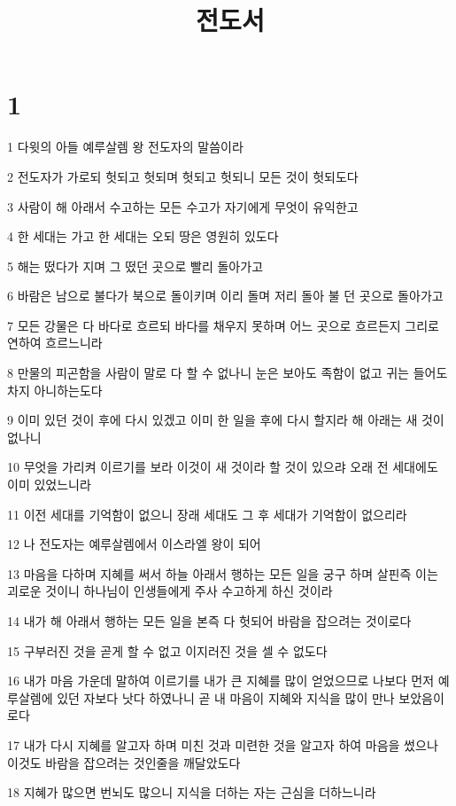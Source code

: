 

\title{전도서}


\chapter{1}

\par 1 다윗의 아들 예루살렘 왕 전도자의 말씀이라
\par 2 전도자가 가로되 헛되고 헛되며 헛되고 헛되니 모든 것이 헛되도다
\par 3 사람이 해 아래서 수고하는 모든 수고가 자기에게 무엇이 유익한고
\par 4 한 세대는 가고 한 세대는 오되 땅은 영원히 있도다
\par 5 해는 떴다가 지며 그 떴던 곳으로 빨리 돌아가고
\par 6 바람은 남으로 불다가 북으로 돌이키며 이리 돌며 저리 돌아 불 던 곳으로 돌아가고
\par 7 모든 강물은 다 바다로 흐르되 바다를 채우지 못하며 어느 곳으로 흐르든지 그리로 연하여 흐르느니라
\par 8 만물의 피곤함을 사람이 말로 다 할 수 없나니 눈은 보아도 족함이 없고 귀는 들어도 차지 아니하는도다
\par 9 이미 있던 것이 후에 다시 있겠고 이미 한 일을 후에 다시 할지라 해 아래는 새 것이 없나니
\par 10 무엇을 가리켜 이르기를 보라 이것이 새 것이라 할 것이 있으랴 오래 전 세대에도 이미 있었느니라
\par 11 이전 세대를 기억함이 없으니 장래 세대도 그 후 세대가 기억함이 없으리라
\par 12 나 전도자는 예루살렘에서 이스라엘 왕이 되어
\par 13 마음을 다하며 지혜를 써서 하늘 아래서 행하는 모든 일을 궁구 하며 살핀즉 이는 괴로운 것이니 하나님이 인생들에게 주사 수고하게 하신 것이라
\par 14 내가 해 아래서 행하는 모든 일을 본즉 다 헛되어 바람을 잡으려는 것이로다
\par 15 구부러진 것을 곧게 할 수 없고 이지러진 것을 셀 수 없도다
\par 16 내가 마음 가운데 말하여 이르기를 내가 큰 지혜를 많이 얻었으므로 나보다 먼저 예루살렘에 있던 자보다 낫다 하였나니 곧 내 마음이 지혜와 지식을 많이 만나 보았음이로다
\par 17 내가 다시 지혜를 알고자 하며 미친 것과 미련한 것을 알고자 하여 마음을 썼으나 이것도 바람을 잡으려는 것인줄을 깨달았도다
\par 18 지혜가 많으면 번뇌도 많으니 지식을 더하는 자는 근심을 더하느니라

